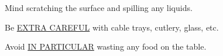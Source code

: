 \documentclass{article}
\begin{document}
\maketitle

\null
\vspace{-1cm}

\begin{center}

\vspace{-1cm}



\vspace{-0.8cm}

\Huge


Mind scratching the surface and spilling any liquids.

Be \underline{EXTRA CAREFUL} with cable trays, cutlery, glass, etc.

Avoid \underline{IN PARTICULAR} wasting any food on the table.


\english






\end{center}

\dansk

\underskriv
\end{document}
